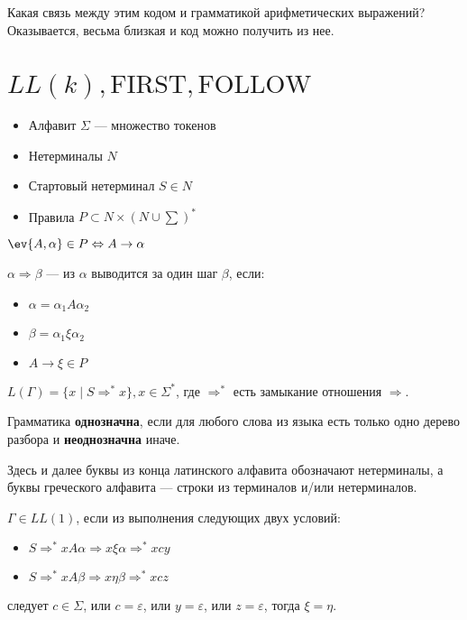 Какая связь между этим кодом и грамматикой арифметических выражений? Оказывается, весьма близкая и код можно получить из нее.

\section{\(LL(k), \mathrm{FIRST}, \mathrm{FOLLOW}\)}

\begin{definition}\itemfix
    \begin{itemize}
        \item Алфавит \(\Sigma\) --- множество токенов
        \item Нетерминалы \(N\)
        \item Стартовый нетерминал \(S \in N\)
        \item Правила \(P \subset N \times (N \cup \sum)^*\)
    \end{itemize}
\end{definition}
\begin{definition}
    \(\ev{A, \alpha} \in P \Leftrightarrow A \to \alpha\)
\end{definition}
\begin{definition}
    \(\alpha \Rightarrow \beta\) --- из \(\alpha\) выводится за один шаг \(\beta\), если:
    \begin{itemize}
        \item \(\alpha = \alpha_1 A \alpha_2\)
        \item \(\beta = \alpha_1 \xi \alpha_2\)
        \item \(A \to \xi \in P\)
    \end{itemize}
\end{definition}
\begin{definition}\itemfix
    \(L(\Gamma) = \{x \mid S \Rightarrow^* x\}, x \in \Sigma^*\), где \( \Rightarrow^*\) есть замыкание отношения \( \Rightarrow \).
\end{definition}

\begin{definition}
    Грамматика \textbf{однозначна}, если для любого слова из языка есть только одно дерево разбора и \textbf{неоднозначна} иначе.
\end{definition}

\begin{remark}
    Здесь и далее буквы из конца латинского алфавита обозначают нетерминалы, а буквы греческого алфавита --- строки из терминалов и/или нетерминалов.
\end{remark}
\begin{definition}
    \(\Gamma \in LL(1)\), если из выполнения следующих двух условий:
    \begin{itemize}
        \item \(S \Rightarrow^* xA\alpha \Rightarrow x\xi\alpha \Rightarrow^* xcy\)
        \item \(S \Rightarrow^* xA\beta \Rightarrow x\eta\beta \Rightarrow^* xcz\)
    \end{itemize}
    следует \(c \in \Sigma\), или \(c = \varepsilon\), или \(y = \varepsilon\), или \(z = \varepsilon\), тогда \(\xi = \eta\).
\end{definition}

